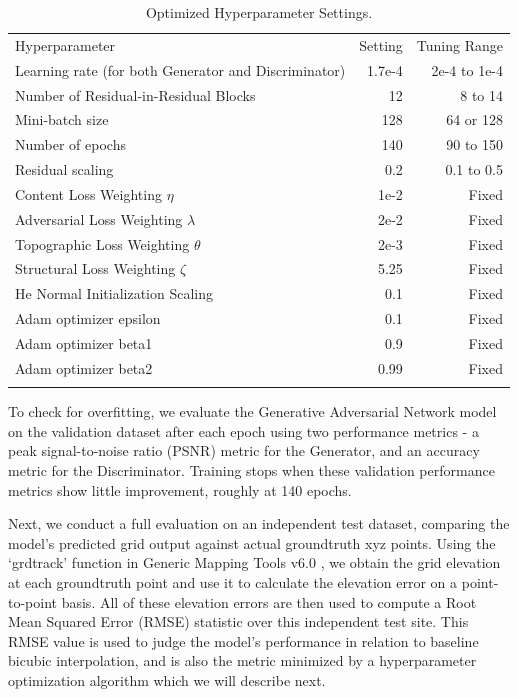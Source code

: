 \documentclass[tc, manuscript]{copernicus}
\begin{document}
\begin{table}[htbp]
  \caption{Optimized Hyperparameter Settings.}
  \label{table:B1}
  \begin{tabular}{lrr}
  \tophline
  Hyperparameter & Setting & Tuning Range \\
  \middlehline
  Learning rate (for both Generator and Discriminator) & 1.7e-4 & 2e-4 to 1e-4 \\
  Number of Residual-in-Residual Blocks & 12 & 8 to 14 \\
  Mini-batch size & 128 & 64 or 128 \\
  Number of epochs & 140 & 90 to 150 \\
  Residual scaling & 0.2 & 0.1 to 0.5 \\
  Content Loss Weighting $\eta$ & 1e-2 & Fixed \\
  Adversarial Loss Weighting $\lambda$ & 2e-2 & Fixed \\
  Topographic Loss Weighting $\theta$ & 2e-3 & Fixed \\
  Structural Loss Weighting $\zeta$ & 5.25 & Fixed \\
  He Normal Initialization Scaling & 0.1 & Fixed \\
  Adam optimizer epsilon & 0.1 & Fixed \\
  Adam optimizer beta1 & 0.9 & Fixed \\
  Adam optimizer beta2 & 0.99 & Fixed \\
  \bottomhline
  \end{tabular}
  \belowtable{} %
\end{table}

To check for overfitting, we evaluate the Generative Adversarial Network model on the validation dataset after each epoch using two performance metrics - a peak signal-to-noise ratio (PSNR) metric for the Generator, and an accuracy metric for the Discriminator.
Training stops when these validation performance metrics show little improvement, roughly at 140 epochs.

Next, we conduct a full evaluation on an independent test dataset, comparing the model's predicted grid output against actual groundtruth xyz points.
Using the `grdtrack' function in Generic Mapping Tools v6.0 \citep{WesselGenericMappingTools2019}, we obtain the grid elevation at each groundtruth point and use it to calculate the elevation error on a point-to-point basis.
All of these elevation errors are then used to compute a Root Mean Squared Error (RMSE) statistic over this independent test site.
This RMSE value is used to judge the model's performance in relation to baseline bicubic interpolation, and is also the metric minimized by a hyperparameter optimization algorithm which we will describe next.
\end{document}
